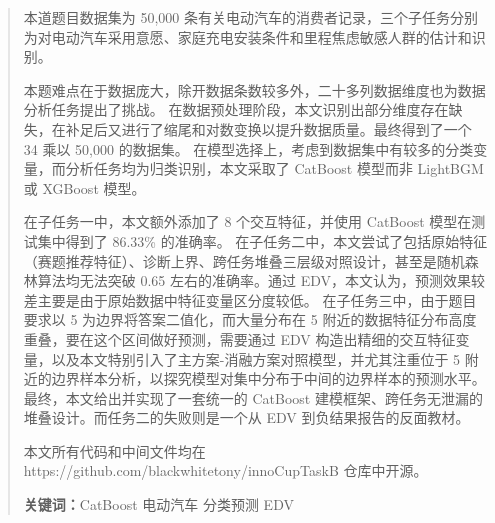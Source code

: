 \begin{abstract}
本道题目数据集为 50,000 条有关电动汽车的消费者记录，三个子任务分别为对电动汽车采用意愿、家庭充电安装条件和里程焦虑敏感人群的估计和识别。

本题难点在于数据庞大，除开数据条数较多外，二十多列数据维度也为数据分析任务提出了挑战。
在数据预处理阶段，本文识别出部分维度存在缺失，在补足后又进行了缩尾和对数变换以提升数据质量。最终得到了一个 34 乘以 50,000 的数据集。
在模型选择上，考虑到数据集中有较多的分类变量，而分析任务均为归类识别，本文采取了 CatBoost 模型而非 LightBGM 或 XGBoost 模型。

在子任务一中，本文额外添加了 8 个交互特征，并使用 CatBoost 模型在测试集中得到了 86.33\% 的准确率。
在子任务二中，本文尝试了包括原始特征（赛题推荐特征）、诊断上界、跨任务堆叠三层级对照设计，甚至是随机森林算法均无法突破 0.65 左右的准确率。通过 EDV，本文认为，预测效果较差主要是由于原始数据中特征变量区分度较低。
在子任务三中，由于题目要求以 5 为边界将答案二值化，而大量分布在 5 附近的数据特征分布高度重叠，要在这个区间做好预测，需要通过 EDV 构造出精细的交互特征变量，以及本文特别引入了主方案-消融方案对照模型，并尤其注重位于 5 附近的边界样本分析，以探究模型对集中分布于中间的边界样本的预测水平。
最终，本文给出并实现了一套统一的 CatBoost 建模框架、跨任务无泄漏的堆叠设计。而任务二的失败则是一个从 EDV 到负结果报告的反面教材。

本文所有代码和中间文件均在 https://github.com/blackwhitetony/innoCupTaskB 仓库中开源。

\textbf{关键词：}CatBoost 电动汽车 分类预测 EDV
\end{abstract}
